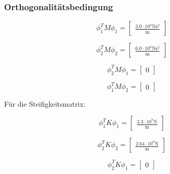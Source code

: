 \documentclass[
  letterpaper,
  DIV=11]{scrreprt}
\begin{document}
\hypertarget{orthogonalituxe4tsbedingung-3}{%
\subsubsection{Orthogonalitätsbedingung}\label{orthogonalituxe4tsbedingung-3}}

\begin{equation}\phi_{1}^{T} M \phi_{1} = \left[\begin{matrix}\frac{3.0 \cdot 10^{4} \text{N} \text{s}^{2}}{\text{m}}\end{matrix}\right]\end{equation}

\begin{equation}\phi_{2}^{T} M \phi_{2} = \left[\begin{matrix}\frac{6.0 \cdot 10^{4} \text{N} \text{s}^{2}}{\text{m}}\end{matrix}\right]\end{equation}

\begin{equation}\phi_{2}^{T} M \phi_{1} = \left[\begin{matrix}0\end{matrix}\right]\end{equation}

\begin{equation}\phi_{1}^{T} M \phi_{2} = \left[\begin{matrix}0\end{matrix}\right]\end{equation}

Für die Steifigkeitsmatrix:

\begin{equation}\phi_{1}^{T} K \phi_{1} = \left[\begin{matrix}\frac{3.3 \cdot 10^{7} \text{N}}{\text{m}}\end{matrix}\right]\end{equation}

\begin{equation}\phi_{2}^{T} K \phi_{2} = \left[\begin{matrix}\frac{2.64 \cdot 10^{8} \text{N}}{\text{m}}\end{matrix}\right]\end{equation}

\begin{equation}\phi_{2}^{T} K \phi_{1} = \left[\begin{matrix}0\end{matrix}\right]\end{equation}
\end{document}
